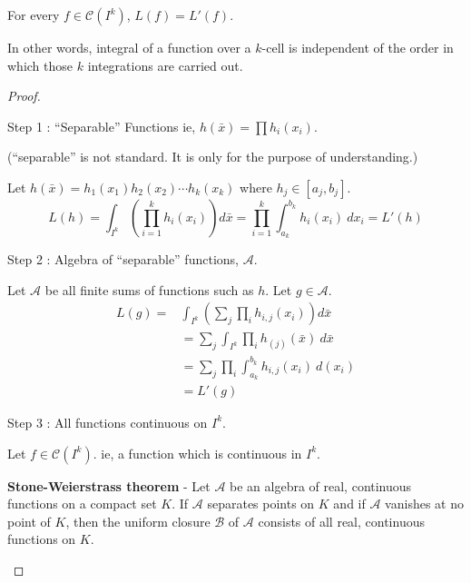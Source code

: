 \begin{theorem}
	For every $f \in \mathscr{C}(I^k)$, $L(f) = L'(f)$.

\begin{commentary}
	In other words, integral of a function over a $k$-cell is independent of the order in which those $k$ integrations are carried out.
\end{commentary}
\end{theorem}
\begin{proof}
\begin{commentary}Step 1 : ``Separable'' Functions ie, $h(\bar{x}) = \prod h_i(x_i)$.\end{commentary}

\begin{commentary}
	(``separable'' is not standard.
	It is only for the purpose of understanding.)
\end{commentary}

Let $h(\bar{x}) = h_1(x_1)h_2(x_2)\cdots h_k(x_k)$ where $h_j \in [a_j,b_j]$.
$$ L(h) = \int_{I^k} \left(\prod_{i = 1}^k h_i(x_i)\right) d\bar{x} = \prod_{i = 1}^k \int_{a_k}^{b_k} h_i(x_i)\ dx_i = L'(h)$$
\begin{commentary}Step 2 : Algebra of ``separable'' functions, $\mathscr{A}$.\end{commentary}

Let $\mathscr{A}$ be all finite sums of functions such as $h$.
Let $g \in \mathscr{A}$.
\begin{align*}
	L(g) = & \int_{I^k} \left(\sum_j \prod_i h_{i,j}(x_i) \right) d\bar{x} \\
	& = \sum_j \int_{I^k} \prod_i h_{(j)}(\bar{x})\ d\bar{x}\\
	& = \sum_j \prod_i \int_{a_k}^{b_k} h_{i,j}(x_i)\ d(x_i)\\
	& = L'(g)
\end{align*}
\begin{commentary}Step 3 : All functions continuous on $I^k$.\end{commentary}

Let $f \in \mathscr{C}(I^k)$.
ie, a function which is continuous in $I^k$.

\begin{commentary}
	\textbf{Stone-Weierstrass theorem} - Let $\mathscr{A}$ be an algebra of real, continuous functions on a compact set $K$.
	If $\mathscr{A}$ separates points on $K$ and if $\mathscr{A}$ vanishes at no point of $K$, then the uniform closure $\mathscr{B}$ of $\mathscr{A}$ consists of all real, continuous functions on $K$.


\end{commentary}
\end{proof}
